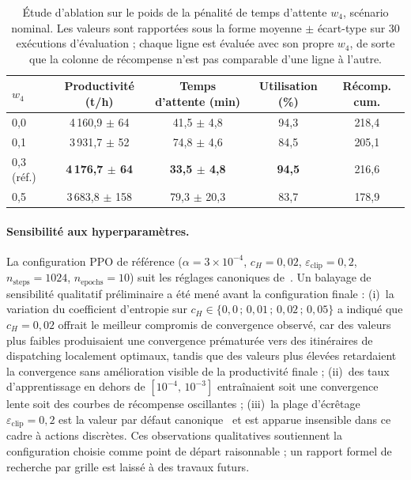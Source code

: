 \documentclass[11pt,a4paper]{article}
\begin{document}
\begin{table}[H]
\centering
\caption{Étude d'ablation sur le poids de la pénalité de temps d'attente $w_4$, scénario nominal. Les valeurs sont rapportées sous la forme moyenne $\pm$ écart-type sur 30 exécutions d'évaluation ; chaque ligne est évaluée avec son propre $w_4$, de sorte que la colonne de récompense n'est pas comparable d'une ligne à l'autre.}
\label{tab:ablation}
\small
\begin{tabular}{lcccc}
\toprule
\textbf{$w_4$} & \textbf{Productivité (t/h)} & \textbf{Temps d'attente (min)} & \textbf{Utilisation (\%)} & \textbf{Récomp. cum.} \\
\midrule
0,0  & 4\,160,9 $\pm$ 64 & 41,5 $\pm$ 4,8 & 94,3 & 218,4 \\
0,1  & 3\,931,7 $\pm$ 52 & 74,8 $\pm$ 4,6 & 84,5 & 205,1 \\
0,3 (réf.) & \textbf{4\,176,7 $\pm$ 64} & \textbf{33,5 $\pm$ 4,8} & \textbf{94,5} & 216,6 \\
0,5  & 3\,683,8 $\pm$ 158 & 79,3 $\pm$ 20,3 & 83,7 & 178,9 \\
\bottomrule
\end{tabular}

\end{table}

\paragraph{Sensibilité aux hyperparamètres.}
La configuration PPO de référence ($\alpha = 3 \times 10^{-4}$,
$c_H = 0{,}02$, $\varepsilon_{\text{clip}} = 0{,}2$,
$n_{\text{steps}} = 1024$, $n_{\text{epochs}} = 10$) suit les
réglages canoniques de~\cite{JohnSchulman2017}.
Un balayage de sensibilité qualitatif préliminaire a été mené avant la configuration finale :
(i)~la variation du coefficient d'entropie sur $c_H \in \{0{,}0\,;\, 0{,}01\,;\, 0{,}02\,;\, 0{,}05\}$
a indiqué que $c_H = 0{,}02$ offrait le meilleur compromis de convergence observé, car des valeurs plus faibles produisaient une convergence prématurée vers des itinéraires de dispatching localement optimaux,
tandis que des valeurs plus élevées retardaient la convergence sans amélioration visible de la productivité finale ;
(ii)~des taux d'apprentissage en dehors de $[10^{-4},\, 10^{-3}]$ entraînaient soit une convergence lente
soit des courbes de récompense oscillantes ;
(iii)~la plage d'écrêtage $\varepsilon_{\text{clip}} = 0{,}2$ est la valeur par défaut canonique~\cite{JohnSchulman2017}
et est apparue insensible dans ce cadre à actions discrètes.
Ces observations qualitatives soutiennent la configuration choisie comme point de départ raisonnable ; un rapport formel de recherche par grille est laissé à des travaux futurs.
\end{document}
